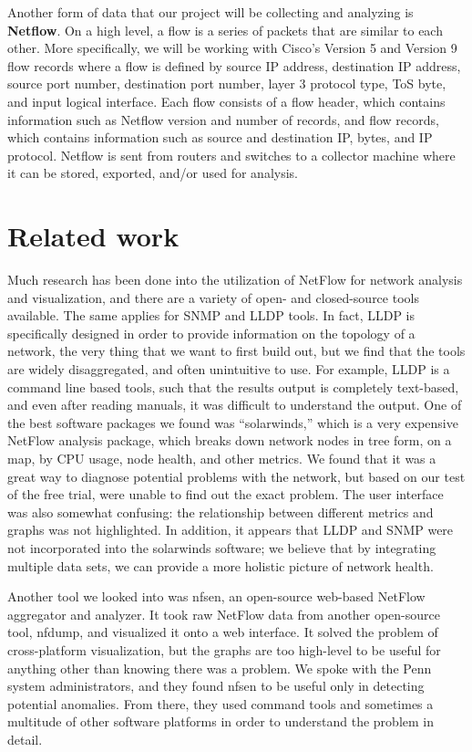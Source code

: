 \documentclass{sig-alternate}
\begin{document}
Another form of data that our project will be collecting and analyzing is
\textbf{Netflow}. On a high level, a flow is a series of packets that are
similar to each other. More specifically, we will be working with Cisco's
Version 5 and Version 9 flow records where a flow is defined by source IP
address, destination IP address, source port number, destination port number,
layer 3 protocol type, ToS byte, and input logical interface. Each flow consists
of a flow header, which contains information such as Netflow version and number
of records, and flow records, which contains information such as source and
destination IP, bytes, and IP protocol. Netflow is sent from routers and
switches to a collector machine where it can be stored, exported, and/or used
for analysis.

\section{Related work}

Much research has been done into the utilization of NetFlow for network analysis
and visualization, and there are a variety of open- and closed-source tools
available. The same applies for SNMP and LLDP tools. In fact, LLDP is
specifically designed in order to provide information on the topology of a
network, the very thing that we want to first build out, but we find that the
tools are widely disaggregated, and often unintuitive to use. For example, LLDP
is a command line based tools, such that the results output is completely
text-based, and even after reading manuals, it was difficult to understand the
output. One of the best software packages we found was ``solarwinds,'' which is
a very expensive NetFlow analysis package, which breaks down network nodes in
tree form, on a map, by CPU usage, node health, and other metrics. We found that
it was a great way to diagnose potential problems with the network, but based on
our test of the free trial, were unable to find out the exact problem. The user
interface was also somewhat confusing: the relationship between different
metrics and graphs was not highlighted. In addition, it appears that LLDP and
SNMP were not incorporated into the solarwinds software; we believe that by
integrating multiple data sets, we can provide a more holistic picture of
network health. 

Another tool we looked into was nfsen, an open-source web-based NetFlow
aggregator and analyzer. It took raw NetFlow data from another open-source tool,
nfdump, and visualized it onto a web interface. It solved the problem of
cross-platform visualization, but the graphs are too high-level to be useful for
anything other than knowing there was a problem. We spoke with the Penn system
administrators, and they found nfsen to be useful only in detecting potential
anomalies. From there, they used command tools and sometimes a multitude of
other software platforms in order to understand the problem in detail.
\end{document}
